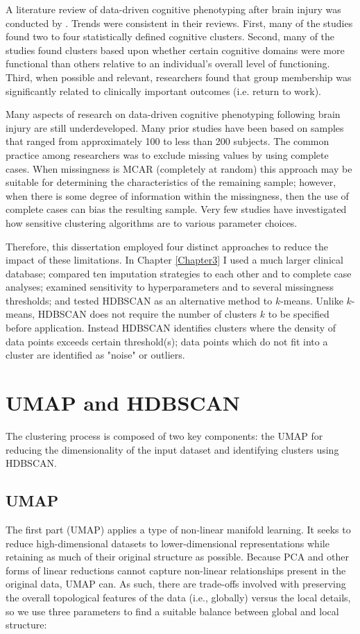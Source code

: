A literature review of data-driven cognitive phenotyping after brain injury was conducted by \parencite{garcia2020data}. Trends were consistent in their reviews. First, many of the studies found two to four statistically defined cognitive clusters. Second, many of the studies found clusters based upon whether certain cognitive domains were more functional than others relative to an individual's overall level of functioning. Third, when possible and relevant, researchers found that group membership was significantly related to clinically important outcomes (i.e. return to work).

Many aspects of research on data-driven cognitive phenotyping following brain injury are still underdeveloped. Many prior studies have been based on samples that ranged from approximately 100 to less than 200 subjects. The common practice among researchers was to exclude missing values by using complete cases. When missingness is MCAR (completely at random) this approach may be suitable for determining the characteristics of the remaining sample; however, when there is some degree of information within the missingness, then the use of complete cases can bias the resulting sample. Very few studies have investigated how sensitive clustering algorithms are to various parameter choices.

Therefore, this dissertation employed four distinct approaches to reduce the impact of these limitations. In Chapter \ref{Chapter3} I used a much larger clinical database; compared ten imputation strategies to each other and to complete case analyses; examined sensitivity to hyperparameters and to several missingness thresholds; and tested HDBSCAN as an alternative method to \(k\)-means. Unlike \(k\)-means, HDBSCAN does not require the number of clusters \(k\) to be specified before application. Instead HDBSCAN identifies clusters where the density of data points exceeds certain threshold(s); data points which do not fit into a cluster are identified as "noise" or outliers.

\section{UMAP and HDBSCAN}
The clustering process is composed of two key components: the UMAP for reducing the dimensionality of the input dataset and identifying clusters using HDBSCAN.

\subsection{UMAP}
The first part (UMAP) applies a type of non-linear manifold learning. It seeks to reduce high-dimensional datasets to lower-dimensional representations while retaining as much of their original structure as possible. Because PCA and other forms of linear reductions cannot capture non-linear relationships present in the original data, UMAP can. As such, there are trade-offs involved with preserving the overall topological features of the data (i.e., globally) versus the local details, so we use three parameters to find a suitable balance between global and local structure:

